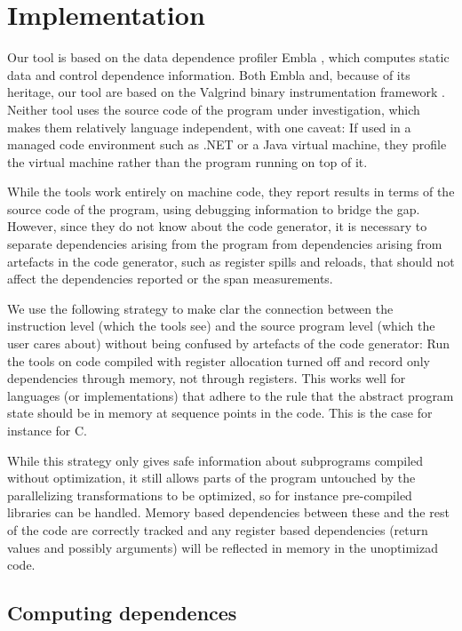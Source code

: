 \section{Implementation}

Our tool is based on the data dependence profiler Embla \cite{embla:08},
which computes static data and control dependence information.  Both Embla
and, because of its heritage, our tool are based on the Valgrind binary
instrumentation framework \cite{valgrind:07}. Neither tool uses the 
source code of the program under investigation, which makes them 
relatively language independent, with one caveat: If used in a managed
code environment such as .NET or a Java virtual machine, they profile the
virtual machine rather than the program running on top of it.

While the tools work entirely on machine code, they report results in terms 
of the source code of the program, using debugging information to bridge
the gap. However, since they do not know about the code generator, it is 
necessary to separate dependencies arising from the program from 
dependencies arising from artefacts in the code generator, such as 
register spills and reloads, that should not affect the dependencies 
reported or the span measurements. 

We use the following strategy to make clar the connection between the 
instruction level (which the tools see) and the source program level 
(which the user cares about) without being confused by artefacts of 
the code generator:
Run the tools on code compiled with register allocation turned off and 
record only dependencies through memory, not through registers.
This works well for languages 
(or implementations) that adhere to the rule that the abstract program 
state should be in memory at sequence points in the code. This is the 
case for instance for C. 

While this strategy only gives safe information about subprograms compiled 
without optimization, it still allows parts of the program untouched by the 
parallelizing transformations to be optimized, so for instance pre-compiled 
libraries can be handled. Memory based dependencies between these and the 
rest of the code are correctly tracked 
and any register based dependencies (return values and possibly arguments)
will be reflected in memory in the
unoptimizad code.


\subsection{Computing dependences}   \label{snca}


